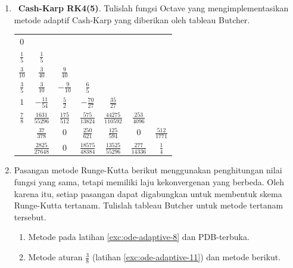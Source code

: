 \begin{enumerate}
\begin{center}
\begin{tabular}{c|ccccc}
0 &  &  &  &  & \tabularnewline
$\frac{1}{4}$ & $\frac{1}{4}$ &  &  &  & \tabularnewline
$\frac{3}{4}$ & $-\frac{9}{4}$ & $3$ &  &  & \tabularnewline
$\frac{1}{2}$ & $\frac{1}{18}$ & $\frac{5}{12}$ & $\frac{1}{36}$ &  & \tabularnewline
$1$ & $\frac{7}{9}$ & $-\frac{5}{3}$ & $-\frac{1}{9}$ & $2$ & \tabularnewline
\hline 
 & $\frac{1}{6}$ & $0$ & $0$ & $\frac{2}{3}$ & $\frac{1}{6}$\tabularnewline
\hline 
 & $\frac{7}{9}$ & $-\frac{5}{3}$ & $-\frac{1}{9}$ & $2$ & $0$\tabularnewline
\end{tabular}
\par\end{center}
\item \octave\ \label{exc:ode-adaptive-13}\textbf{Cash-Karp RK4(5)}. Tulislah
fungsi Octave yang mengimplementasikan metode adaptif Cash-Karp yang
diberikan oleh tableau Butcher. \hasananswer {}

\begin{center}
\begin{tabular}{c|cccccc}
0 &  &  &  &  &  & \tabularnewline
$\frac{1}{5}$ & $\frac{1}{5}$ &  &  &  &  & \tabularnewline
$\frac{3}{10}$ & $\frac{3}{40}$ & $\frac{9}{40}$ &  &  &  & \tabularnewline
$\frac{3}{5}$ & $\frac{3}{10}$ & $-\frac{9}{10}$ & $\frac{6}{5}$ &  &  & \tabularnewline
$1$ & $-\frac{11}{54}$ & $\frac{5}{2}$ & $-\frac{70}{27}$ & $\frac{35}{27}$ &  & \tabularnewline
$\frac{7}{8}$ & $\frac{1631}{55296}$ & $\frac{175}{512}$ & $\frac{575}{13824}$ & $\frac{44275}{110592}$ & $\frac{253}{4096}$ & \tabularnewline
\hline 
 & $\frac{37}{378}$ & $0$ & $\frac{250}{621}$ & $\frac{125}{594}$ & $0$ & $\frac{512}{1771}$\tabularnewline
\hline 
 & $\frac{2825}{27648}$ & $0$ & $\frac{18575}{48384}$ & $\frac{13525}{55296}$ & $\frac{277}{14336}$ & $\frac{1}{4}$\tabularnewline
\end{tabular}
\par\end{center}
\item \label{exc:ode-adaptive-14}Pasangan metode Runge-Kutta berikut menggunakan
penghitungan nilai fungsi yang sama, tetapi memiliki laju kekonvergenan
yang berbeda. Oleh karena itu, setiap pasangan dapat digabungkan untuk
membentuk skema Runge-Kutta tertanam. Tulislah tableau Butcher untuk
metode tertanam tersebut.

\begin{enumerate}
\item \label{exc:ode-adaptive-16}Metode pada latihan \ref{exc:ode-adaptive-8}
dan PDB-terbuka.
\item \label{exc:ode-adaptive-17}Metode aturan $\frac{3}{8}$ (latihan
\ref{exc:ode-adaptive-11}) dan metode berikut. \hasananswer 


\end{enumerate}
\end{enumerate}
